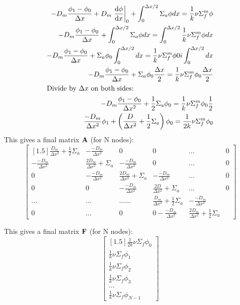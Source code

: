 \documentclass[../main.tex]{subfiles}
\begin{document}
	\begin{align*}
		-D_m \frac{\phi_1 - \phi_0}{\Delta x} + D_m \left. \dv{\phi}{x} \right|_0 + \int_0^{\Delta x / 2} 
			\Sigma_a \phi dx =   \frac{1}{k} \nu \Sigma^m_f \phi \\
		-D_m \frac{\phi_1 - \phi_0}{\Delta x} +  \int_0^{\Delta x / 2} 
			\Sigma_a \phi dx = \int_0^{\Delta x / 2}  \frac{1}{k} \nu \Sigma^m_f \phi dx \\
		-D_m \frac{\phi_1 - \phi_0}{\Delta x} + \Sigma_a \phi_0 \int_0^{\Delta x / 2}
			dx = \frac{1}{k} \nu \Sigma^m_f \phi0i \int_0^{\Delta x / 2} dx \\
			-D_m \frac{\phi_1 - \phi_0}{\Delta x} + \Sigma_a \phi_0  \frac{\Delta x}{2} = \frac{1}{k} \nu \Sigma^m_f \phi_0 \frac{\Delta x}{2} \\
	\intertext{Divide by $\Delta x$ on both sides:}
		-D_m \frac{\phi_1 - \phi_0}{\Delta x^2}  + \frac{1}{2} \Sigma_a \phi_0 =  \frac{1}{k} \nu \Sigma^m_f \phi_0 \frac{1}{2} \\
		\frac{-D_m}{\Delta x^2} \phi_1 + \left( \frac{D}{\Delta x^2} + \frac{1}{2} \Sigma_a \right) \phi_0 = \frac{1}{2k} \nu \Sigma^m_f \phi_0
	\end{align*}
	This gives a final matrix $\mathbf{A}$ (for N nodes):
	\[
	\begin{bmatrix}[1.5]
		\frac{D_m}{\Delta x^2} + \frac{1}{2}\Sigma_a & - \frac{-D_m}{\Delta x^2} & 0 & 0 & \dots & 0\\
		- \frac{-D_m}{\Delta x^2} & \frac{2D_m}{\Delta x^2} + \Sigma_a & - \frac{-D_m}{\Delta x^2} & 0 & \dots & 0 \\
		0 & - \frac{-D_m}{\Delta x^2} & \frac{2D_m}{\Delta x^2} + \Sigma_a & - \frac{-D_m}{\Delta x^2} & \dots & 0 \\
		0 & 0 & - \frac{-D_m}{\Delta x^2} & \frac{2D}{\Delta x^2} + \Sigma_a & \dots & 0 \\
		\dots & \dots & \dots \dots & \frac{D_m}{\Delta x^2} + \frac{1}{2}\Sigma_a & - \frac{-D_m}{\Delta x^2} \\
		0 & \dots & 0 & 0 - \frac{-D_m}{\Delta x^2} & \frac{2 D_m}{\Delta x^2} + \frac{1}{2}\Sigma_a
	\end{bmatrix}
	\]


This gives a final matrix $\mathbf{F}$ (for N nodes):
	\[
	\begin{bmatrix}[1.5]
		\frac{1}{2k} \nu \Sigma_f \phi_0  \\
		\frac{1}{k} \nu \Sigma_f \phi_1  \\
		\frac{1}{k} \nu \Sigma_f \phi_2  \\
		\frac{1}{k} \nu \Sigma_f \phi_3  \\
		\dots \\
		\frac{1}{k} \nu \Sigma_f \phi_{N-1}
	\end{bmatrix}
	\]
	
\end{document}

